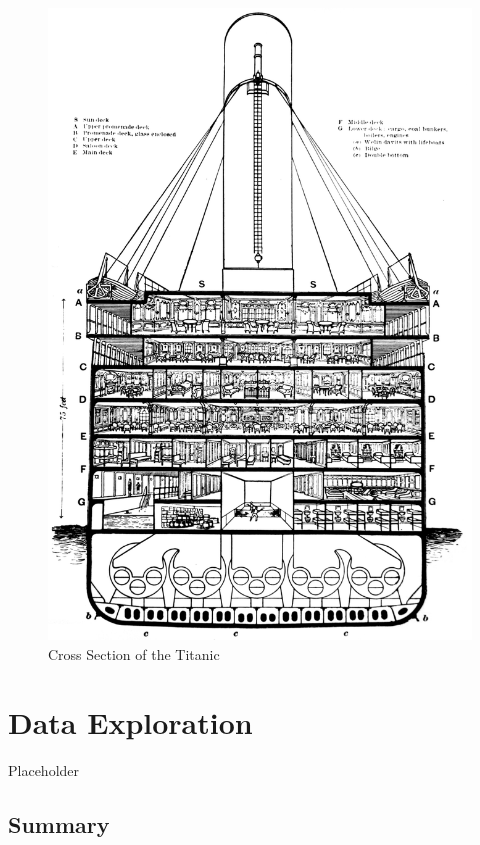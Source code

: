 \documentclass[12pt, oneside]{book}
\begin{document}
\begin{figure}
\centering
\includegraphics{assets/cross_section.png}
\caption{\label{fig:crosssection}Cross Section of the Titanic}
\end{figure}

\hypertarget{data_explore}{%
\chapter{Data Exploration}\label{data_explore}}

Placeholder

\hypertarget{summary}{%
\section{Summary}\label{summary}}
\end{document}
